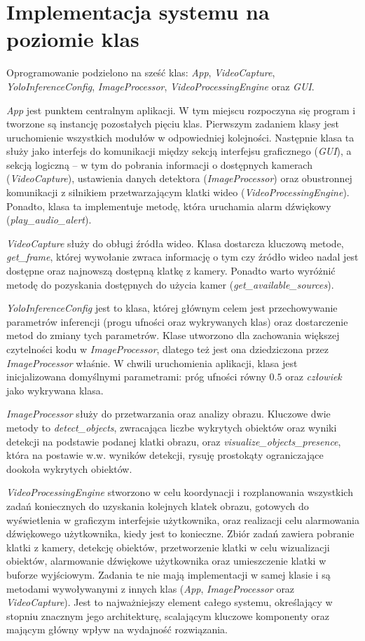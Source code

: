 \section{Implementacja systemu na poziomie klas}
Oprogramowanie podzielono na sześć klas: \emph{App}, \emph{VideoCapture}, \emph{YoloInferenceConfig}, \emph{ImageProcessor}, \emph{VideoProcessingEngine} oraz \emph{GUI}.

\emph{App} jest punktem centralnym aplikacji. W tym miejscu rozpoczyna się program i tworzone są instancję pozostałych pięciu klas. Pierwszym zadaniem klasy jest uruchomienie wszystkich modułów w odpowiedniej kolejności. Następnie klasa ta służy jako interfejs do komunikacji między sekcją interfejsu graficznego (\emph{GUI}), a sekcją logiczną -- w tym do pobrania informacji o dostępnych kamerach (\emph{VideoCapture}), ustawienia danych detektora (\emph{ImageProcessor}) oraz obustronnej komunikacji z silnikiem przetwarzającym klatki wideo (\emph{VideoProcessingEngine}). 
Ponadto, klasa ta implementuje metodę, która uruchamia alarm dźwiękowy (\emph{{play\_audio\_alert}}). 

\emph{VideoCapture} służy do obługi źródła wideo. Klasa dostarcza kluczową metode, \emph{get\_frame}, której wywołanie zwraca informację o tym czy źródło wideo nadal jest dostępne oraz najnowszą dostępną klatkę z kamery. Ponadto warto wyróżnić metodę do pozyskania dostępnych do użycia kamer (\emph{get\_available\_sources}).

\emph{YoloInferenceConfig} jest to klasa, której głównym celem jest przechowywanie parametrów inferencji (progu ufności oraz wykrywanych klas) oraz dostarczenie metod do zmiany tych parametrów. Klase utworzono dla zachowania większej czytelności kodu w \emph{ImageProcessor}, dlatego też jest ona dziedziczona przez \emph{ImageProcessor} właśnie. W chwili uruchomienia aplikacji, klasa jest inicjalizowana domyślnymi parametrami: próg ufności równy $0.5$ oraz \emph{człowiek} jako wykrywana klasa. 

\emph{ImageProcessor} służy do przetwarzania oraz analizy obrazu. Kluczowe dwie metody to \emph{detect\_objects}, zwracająca liczbe wykrytych obiektów oraz wyniki detekcji na podstawie podanej klatki obrazu, oraz \emph{visualize\_objects\_presence}, która na postawie w.w. wyników detekcji, rysuję prostokąty ograniczające dookoła wykrytych obiektów.

\emph{VideoProcessingEngine} stworzono w celu koordynacji i rozplanowania wszystkich zadań koniecznych do uzyskania kolejnych klatek obrazu, gotowych do wyświetlenia w graficzym interfejsie użytkownika, oraz realizacji celu alarmowania dźwiękowego użytkownika, kiedy jest to konieczne. Zbiór zadań zawiera pobranie klatki z kamery, detekcję obiektów, przetworzenie klatki w celu wizualizacji obiektów, alarmowanie dźwiękowe użytkownika oraz umieszczenie klatki w buforze wyjściowym. Zadania te nie mają implementacji w samej klasie i są metodami wywoływanymi z innych klas (\emph{App}, \emph{ImageProcessor} oraz \emph{VideoCapture}). Jest to najważniejszy element całego systemu, określający w stopniu znacznym jego architekturę, scalającym kluczowe komponenty oraz mającym główny wpływ na wydajność rozwiązania.

